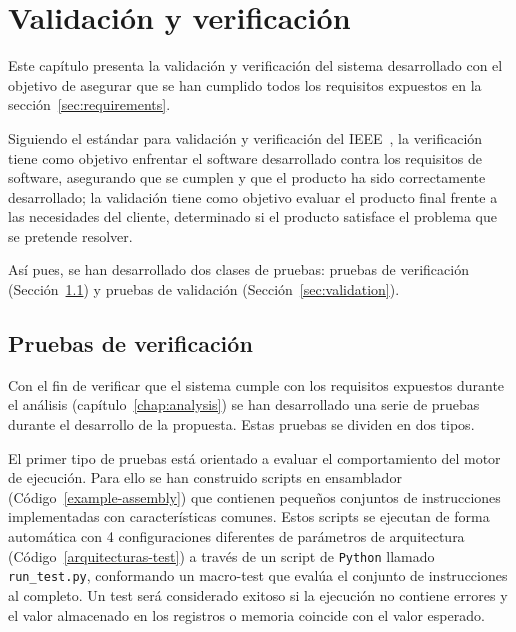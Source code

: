 \chapter{Validación y verificación}\label{chap:validation}

Este capítulo presenta la validación y verificación del sistema desarrollado con el objetivo de asegurar que se han cumplido todos los requisitos expuestos en la sección~\ref{sec:requirements}.

Siguiendo el estándar para validación y  verificación del IEEE~\cite{6204026}, la verificación tiene como objetivo enfrentar el software desarrollado contra los requisitos de software, asegurando que se cumplen y que el producto ha sido correctamente desarrollado; la {validación} tiene como objetivo evaluar el producto final frente a las necesidades del cliente, determinado si el producto satisface el problema que se pretende resolver.

Así pues, se han desarrollado dos clases de pruebas: pruebas de verificación (Sección~\ref{sec:verification}) y pruebas de validación (Sección~\ref{sec:validation}).

{\printtesttemplate}

{\FloatBarrier}

\section{Pruebas de verificación}\label{sec:verification}

Con el fin de verificar que el sistema cumple con los requisitos expuestos durante el análisis (capítulo~\ref{chap:analysis}) se han desarrollado una serie de pruebas durante el desarrollo de la propuesta. Estas pruebas se dividen en dos tipos. 

El primer tipo de pruebas está orientado a evaluar el comportamiento del motor de ejecución. Para ello se han construido scripts en ensamblador (Código~\ref{example-assembly}) que contienen pequeños conjuntos de instrucciones implementadas con características comunes. Estos scripts se ejecutan de forma automática con 4 configuraciones diferentes de parámetros de arquitectura (Código~\ref{arquitecturas-test}) a través de un script de \texttt{Python} llamado \texttt{run\_test.py}, conformando un macro-test que evalúa el conjunto de instrucciones al completo. Un test será considerado exitoso si la ejecución no contiene errores y el valor almacenado en los registros o memoria coincide con el valor esperado.

